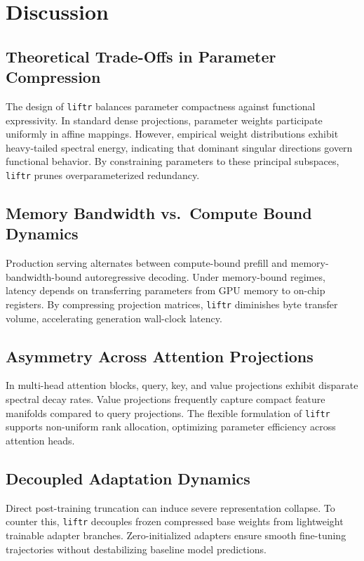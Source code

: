 \section{Discussion}

\subsection{Theoretical Trade-Offs in Parameter Compression}
The design of \texttt{liftr} balances parameter compactness against functional expressivity. In standard dense projections, parameter weights participate uniformly in affine mappings. However, empirical weight distributions exhibit heavy-tailed spectral energy, indicating that dominant singular directions govern functional behavior. By constraining parameters to these principal subspaces, \texttt{liftr} prunes overparameterized redundancy.

\subsection{Memory Bandwidth vs.\ Compute Bound Dynamics}
Production serving alternates between compute-bound prefill and memory-bandwidth-bound autoregressive decoding. Under memory-bound regimes, latency depends on transferring parameters from GPU memory to on-chip registers. By compressing projection matrices, \texttt{liftr} diminishes byte transfer volume, accelerating generation wall-clock latency.

\subsection{Asymmetry Across Attention Projections}
In multi-head attention blocks, query, key, and value projections exhibit disparate spectral decay rates. Value projections frequently capture compact feature manifolds compared to query projections. The flexible formulation of \texttt{liftr} supports non-uniform rank allocation, optimizing parameter efficiency across attention heads.

\subsection{Decoupled Adaptation Dynamics}
Direct post-training truncation can induce severe representation collapse. To counter this, \texttt{liftr} decouples frozen compressed base weights from lightweight trainable adapter branches. Zero-initialized adapters ensure smooth fine-tuning trajectories without destabilizing baseline model predictions.

